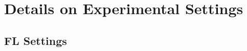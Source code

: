 \documentclass[sigconf]{acmart}
\begin{document}

\section{Details on Experimental Settings}\label{sec:appendix-settings}

    \subsection{FL Settings}\label{subsec:appendix-settings-flsettings}
\end{document}
